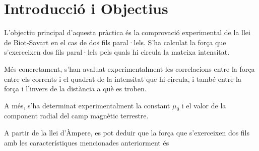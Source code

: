

% 
\begin{abstract}
Aquest informe presenta els resultats de l'estudi de la força exercida entre dos corrents paral·lels pels quals hi circula la mateixa intensitat. Concretament, s'ha provat experimentalment la dependència lineal entre la força i el quadrat de la intensitat i entre la força i l'invers de la distància entre els fils.

A més, s'ha trobat experimentalment el valor de la constant $\mu_0$ assumint la llei de Biot-Savart, i obtenint $\mu_0=(1.25\pm0.04)\cdot10^{-6}\ \si{N/A^2}$ i $\mu_0=(3.0\pm0.4)\cdot10^{-6}\ \si{N/A^2}$. El primer valor és consistent amb el tabulat, mentre que el segon només n'és de l'ordre. 

Finalment, s'ha mesurat la component radial del camp magnètic terrestre, obtenint un valor de $B=(1.59\pm0.18)\cdot10^{-5}\ \si{T}$, de l'ordre del que descriuen altres articles.
\end{abstract}

\section{Introducció i Objectius}
L'objectiu principal d'aquesta pràctica és la comprovació experimental de la llei de Biot-Savart en el cas de dos fils paral·lels. S'ha calculat la força que s'exerceixen dos fils paral·lels pels quals hi circula la mateixa intensitat.

Més concretament, s'han avaluat experimentalment les correlacions entre la força entre els corrents i el quadrat de la intensitat que hi circula, i també entre la força i l'invers de la distància a què es troben.

 A més, s'ha determinat experimentalment la constant $\mu_0$ i el valor de la component radial del camp magnètic terrestre.

A partir de la llei d'Àmpere, es pot deduir que la força que s'exerceixen dos fils amb les característiques mencionades anteriorment és 

